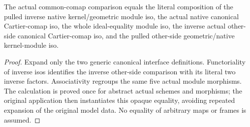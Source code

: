 \begin{lemma}
\label{lem:seven-two-cartier-kernel-comaps-explicit-composition-route}
\leanok
{}
The actual common-comap comparison equals the literal composition of the
pulled inverse native kernel/geometric module iso, the actual native
canonical Cartier-comap iso, the whole ideal-equality module iso, the
inverse actual other-side canonical Cartier-comap iso, and the pulled
other-side geometric/native kernel-module iso.
\end{lemma}
\begin{proof}
Expand only the two generic canonical interface definitions. Functoriality
of inverse isos identifies the inverse other-side comparison with its
literal two inverse factors. Associativity regroups the same five actual
module morphisms. The calculation is proved once for abstract actual
schemes and morphisms; the original application then instantiates this
opaque equality, avoiding repeated expansion of the original model data.
No equality of arbitrary maps or frames is assumed.
\end{proof}

